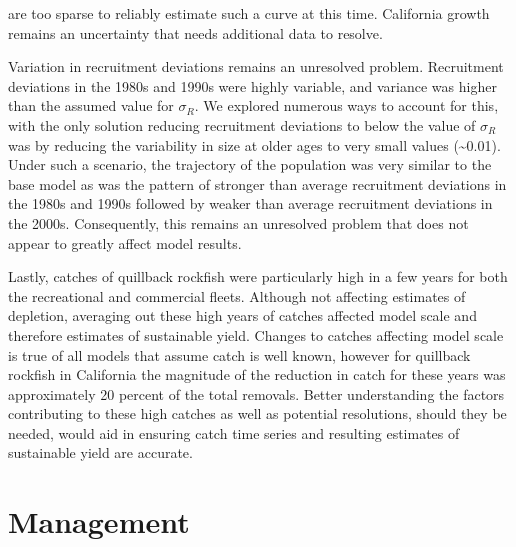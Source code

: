 \documentclass[11pt,
  english,
  a4paper,
]{article}
\begin{document}
are too sparse to reliably estimate such a curve at this time. California growth remains an uncertainty that needs additional data to resolve.

\leavevmode\tagmcend\tagstructend\par


Variation in recruitment deviations remains an unresolved problem. Recruitment deviations in the 1980s and 1990s were highly variable, and variance was higher than the assumed value for {\({\sigma}_R\)\leavevmode\tagmcend\tagstructend}. We explored numerous ways to account for this, with the only solution reducing recruitment deviations to below the value of {\({\sigma}_R\)\leavevmode\tagmcend\tagstructend} was by reducing the variability in size at older ages to very small values (\textasciitilde0.01). Under such a scenario, the trajectory of the population was very similar to the base model as was the pattern of stronger than average recruitment deviations in the 1980s and 1990s followed by weaker than average recruitment deviations in the 2000s. Consequently, this remains an unresolved problem that does not appear to greatly affect model results.

\leavevmode\tagmcend\tagstructend\par


Lastly, catches of quillback rockfish were particularly high in a few years for both the recreational and commercial fleets. Although not affecting estimates of depletion, averaging out these high years of catches affected model scale and therefore estimates of sustainable yield. Changes to catches affecting model scale is true of all models that assume catch is well known, however for quillback rockfish in California the magnitude of the reduction in catch for these years was approximately 20 percent of the total removals. Better understanding the factors contributing to these high catches as well as potential resolutions, should they be needed, would aid in ensuring catch time series and resulting estimates of sustainable yield are accurate.

\leavevmode\tagmcend\tagstructend\par


\hypertarget{management}{%
\section{Management}\label{management}}
\end{document}
